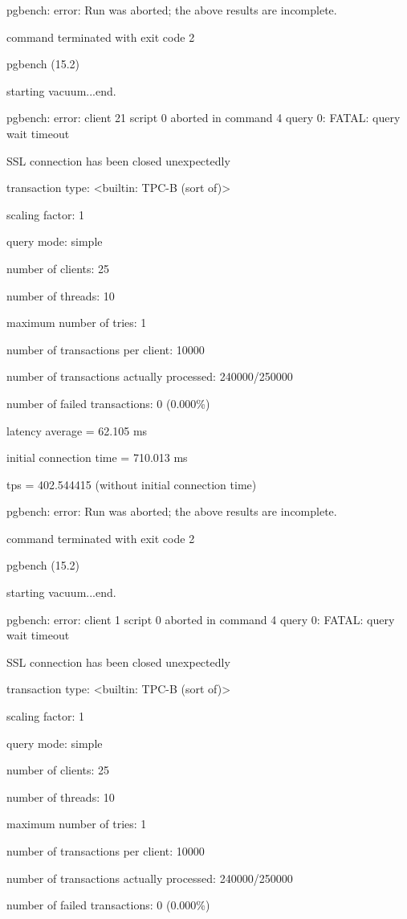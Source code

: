 pgbench: error: Run was aborted; the above results are incomplete.

command terminated with exit code 2

pgbench (15.2)

starting vacuum...end.

pgbench: error: client 21 script 0 aborted in command 4 query 0: FATAL:  query wait timeout

SSL connection has been closed unexpectedly

transaction type: <builtin: TPC-B (sort of)>

scaling factor: 1

query mode: simple

number of clients: 25

number of threads: 10

maximum number of tries: 1

number of transactions per client: 10000

number of transactions actually processed: 240000/250000

number of failed transactions: 0 (0.000\%)

latency average = 62.105 ms

initial connection time = 710.013 ms

tps = 402.544415 (without initial connection time)

pgbench: error: Run was aborted; the above results are incomplete.

command terminated with exit code 2

pgbench (15.2)

starting vacuum...end.

pgbench: error: client 1 script 0 aborted in command 4 query 0: FATAL:  query wait timeout

SSL connection has been closed unexpectedly

transaction type: <builtin: TPC-B (sort of)>

scaling factor: 1

query mode: simple

number of clients: 25

number of threads: 10

maximum number of tries: 1

number of transactions per client: 10000

number of transactions actually processed: 240000/250000

number of failed transactions: 0 (0.000\%)

